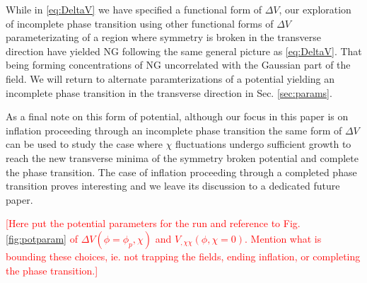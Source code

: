While in \eqref{eq:DeltaV} we have specified a functional form of $\Delta V$, our exploration of incomplete phase transition using other functional forms of $\Delta V$ parameterizating of a region where symmetry is broken in the transverse direction have yielded NG following the same general picture as \eqref{eq:DeltaV}. That being forming concentrations of NG uncorrelated with the Gaussian part of the field. We will return to alternate paramterizations of a potential yielding an incomplete phase transition in the transverse direction in Sec. \ref{sec:params}. 

\Fpotential

As a final note on this form of potential, although our focus in this paper is on inflation proceeding through an incomplete phase transition the same form of $\Delta V$ can be used to study the case where $\chi$ fluctuations undergo sufficient growth to reach the new transverse minima of the symmetry broken potential and complete the phase transition. The case of inflation proceeding through a completed phase transition proves interesting and we leave its discussion to a dedicated future paper.

\Fpotparam

\textcolor{red}{[Here put the potential parameters for the run and reference to Fig. \ref{fig:potparam} of $\Delta V(\phi=\phi_p,\chi)$ and $V_{,\chi\chi}(\phi,\chi=0)$. Mention what is bounding these choices, ie. not trapping the fields, ending inflation, or completing the phase transition.]}
